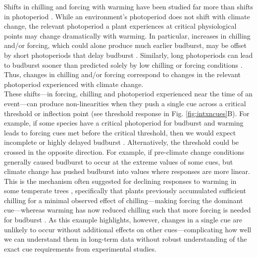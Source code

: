 \documentclass[11pt,letter]{article}
\begin{document}
Shifts in chilling and forcing with warming have been studied far more than shifts in photoperiod \citep[but see][]{saikkonen2012,way2015}. While an environment's photoperiod does not shift with climate change, the relevant photoperiod a plant experiences at critical physiological points may change dramatically with warming. In particular, increases in chilling and/or forcing, which could alone produce much earlier budburst, may be offset by short photoperiods that delay budburst \citep{gauzere2019}. Similarly, long photoperiods can lead to budburst sooner than predicted solely by low chilling or forcing conditions \citep{Nienstaedt:1966aa,Myking:1995,Partanen:1998aa}. Thus, changes in chilling and/or forcing correspond to changes in the relevant photoperiod experienced with climate change. \\

These shifts---in forcing, chilling and photoperiod experienced near the time of an event---can produce non-linearities when they push a single cue across a critical threshold or inflection point (see threshold response in Fig. \ref{fig:intxncues}B). For example, if some species have a critical photoperiod for budburst and warming leads to forcing cues met before the critical threshold, then we would expect incomplete or highly delayed budburst \citep{Singh:2017,rinne2018}. Alternatively, the threshold could be crossed in the opposite direction. For example, if pre-climate change conditions generally caused budburst to occur at the extreme values of some cues, but climate change has pushed budburst into values where responses are more linear. This is the mechanism often suggested for declining responses to warming in some temperate trees \citep{fu2015,piao2017,gauzere2019}, specifically that plants previously accumulated sufficient chilling for a minimal observed effect of chilling---making forcing the dominant cue---whereas warming has now reduced chilling such that more forcing is needed for budburst \citep[producing an overall muted effect when estimated as change in days per $\degree$C, see][for one example]{fu2015}. As this example highlights, however, changes in a single cue are unlikely to occur without additional effects on other cues---complicating how well we can understand them in long-term data without robust understanding of the exact cue requirements from experimental studies.\\
\end{document}
